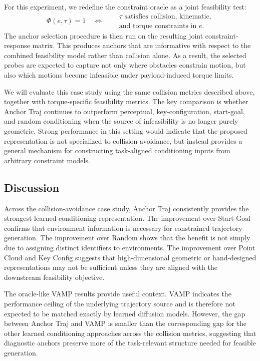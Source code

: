 For this experiment, we redefine the constraint oracle as a joint feasibility test:
%
\begin{equation}
    \Phi(e,\tau)=1
    \quad \Longleftrightarrow \quad
    \begin{aligned}
        &\tau \text{ satisfies collision, kinematic,}\\
        &\text{and torque constraints in } e.
    \end{aligned}
\end{equation}
%
The anchor selection procedure is then run on the resulting joint constraint-response matrix. This produces anchors that are informative with respect to the combined feasibility model rather than collision alone. As a result, the selected probes are expected to capture not only where obstacles constrain motion, but also which motions become infeasible under payload-induced torque limits.

We will evaluate this case study using the same collision metrics described above, together with torque-specific feasibility metrics. The key comparison is whether Anchor Traj continues to outperform perceptual, key-configuration, start-goal, and random conditioning when the source of infeasibility is no longer purely geometric. Strong performance in this setting would indicate that the proposed representation is not specialized to collision avoidance, but instead provides a general mechanism for constructing task-aligned conditioning inputs from arbitrary constraint models.

\subsection{Discussion}

Across the collision-avoidance case study, Anchor Traj consistently provides the strongest learned conditioning representation. The improvement over Start-Goal confirms that environment information is necessary for constrained trajectory generation. The improvement over Random shows that the benefit is not simply due to assigning distinct identifiers to environments. The improvement over Point Cloud and Key Config suggests that high-dimensional geometric or hand-designed representations may not be sufficient unless they are aligned with the downstream feasibility objective.

The oracle-like VAMP results provide useful context. VAMP indicates the performance ceiling of the underlying trajectory source and is therefore not expected to be matched exactly by learned diffusion models. However, the gap between Anchor Traj and VAMP is smaller than the corresponding gap for the other learned conditioning approaches across the collision metrics, suggesting that diagnostic anchors preserve more of the task-relevant structure needed for feasible generation.

